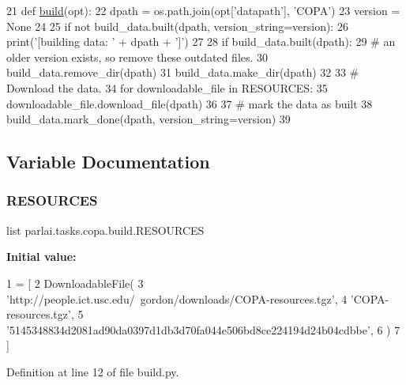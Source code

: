 \begin{DoxyCode}
21 \textcolor{keyword}{def }\hyperlink{namespacedialog__babi__feedback_1_1build_a7a9d289f7493a5ded13c4b7f071b6184}{build}(opt):
22     dpath = os.path.join(opt[\textcolor{stringliteral}{'datapath'}], \textcolor{stringliteral}{'COPA'})
23     version = \textcolor{keywordtype}{None}
24 
25     \textcolor{keywordflow}{if} \textcolor{keywordflow}{not} build\_data.built(dpath, version\_string=version):
26         print(\textcolor{stringliteral}{'[building data: '} + dpath + \textcolor{stringliteral}{']'})
27 
28         \textcolor{keywordflow}{if} build\_data.built(dpath):
29             \textcolor{comment}{# an older version exists, so remove these outdated files.}
30             build\_data.remove\_dir(dpath)
31         build\_data.make\_dir(dpath)
32 
33         \textcolor{comment}{# Download the data.}
34         \textcolor{keywordflow}{for} downloadable\_file \textcolor{keywordflow}{in} RESOURCES:
35             downloadable\_file.download\_file(dpath)
36 
37         \textcolor{comment}{# mark the data as built}
38         build\_data.mark\_done(dpath, version\_string=version)
39 \end{DoxyCode}


\subsection{Variable Documentation}
\mbox{\label{namespaceparlai_1_1tasks_1_1copa_1_1build_a62573c3b2b21231246c8e91efdb78c4e}} 
\subsubsection{\texorpdfstring{R\+E\+S\+O\+U\+R\+C\+ES}{RESOURCES}}
{\footnotesize\ttfamily list parlai.\+tasks.\+copa.\+build.\+R\+E\+S\+O\+U\+R\+C\+ES}

{\bfseries Initial value\+:}
\begin{DoxyCode}
1 =  [
2     DownloadableFile(
3         \textcolor{stringliteral}{'http://people.ict.usc.edu/~gordon/downloads/COPA-resources.tgz'},
4         \textcolor{stringliteral}{'COPA-resources.tgz'},
5         \textcolor{stringliteral}{'5145348834d2081ad90da0397d1db3d70fa044e506bd8ce224194d24b04cdbbe'},
6     )
7 ]
\end{DoxyCode}


Definition at line 12 of file build.\+py.

